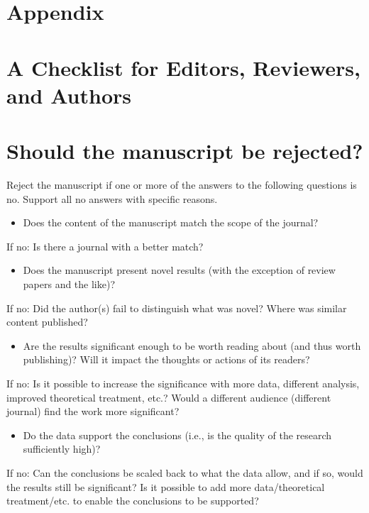\section*{Appendix}
\section*{A Checklist for Editors, Reviewers, and Authors}
\section*{Should the manuscript be rejected?}
Reject the manuscript if one or more of the answers to the following questions is no. Support all no answers with specific reasons.

\begin{itemize}
  \item Does the content of the manuscript match the scope of the journal?
\end{itemize}

If no: Is there a journal with a better match?

\begin{itemize}
  \item Does the manuscript present novel results (with the exception of review papers and the like)?
\end{itemize}

If no: Did the author(s) fail to distinguish what was novel? Where was similar content published?

\begin{itemize}
  \item Are the results significant enough to be worth reading about (and thus worth publishing)? Will it impact the thoughts or actions of its readers?
\end{itemize}

If no: Is it possible to increase the significance with more data, different analysis, improved theoretical treatment, etc.? Would a different audience (different journal) find the work more significant?

\begin{itemize}
  \item Do the data support the conclusions (i.e., is the quality of the research sufficiently high)?
\end{itemize}

If no: Can the conclusions be scaled back to what the data allow, and if so, would the results still be significant? Is it possible to add more data/theoretical treatment/etc. to enable the conclusions to be supported?

